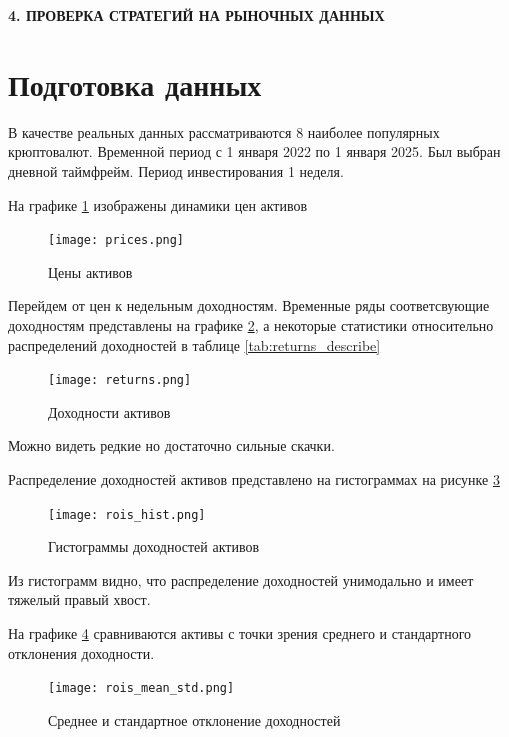 \newpage
\begin{center}
	\textbf{\large 4. ПРОВЕРКА СТРАТЕГИЙ НА РЫНОЧНЫХ ДАННЫХ}
\end{center}

\section{Подготовка данных}

В качестве реальных данных рассматриваются 8 наиболее популярных крюптовалют.
Временной период с 1 января 2022 по  1 января 2025.
Был выбран дневной таймфрейм.
Период инвестирования 1 неделя.

На графике \ref{fig:prices} изображены динамики цен активов 

\begin{figure}[H]
	\centering
	\texttt{[image: prices.png]}
	\caption{Цены активов}
	\label{fig:prices}
\end{figure}

Перейдем от цен к недельным доходностям. Временные ряды соответсвующие доходностям 
представлены на графике \ref{fig:returns}, а некоторые статистики относительно распределений
доходностей в таблице \ref{tab:returns_describe}



\begin{figure}[H]
	\centering
	\texttt{[image: returns.png]}
	\caption{Доходности активов}
	\label{fig:returns}
\end{figure}
Можно видеть редкие но достаточно сильные скачки.

Распределение доходностей активов представлено на гистограммах на рисунке \ref{fig:rois_hist}

\begin{figure}[H]
	\centering
	\texttt{[image: rois\_hist.png]}
	\caption{Гистограммы доходностей активов}
	\label{fig:rois_hist}
\end{figure}

Из гистограмм видно, что распределение доходностей унимодально и имеет тяжелый правый хвост.

На графике \ref{fig:rois_mean_std} сравниваются активы с точки зрения 
среднего и стандартного отклонения доходности.

\begin{figure}[H]
	\centering
	\texttt{[image: rois\_mean\_std.png]}
	\caption{Среднее и стандартное отклонение доходностей}
	\label{fig:rois_mean_std}
\end{figure}

